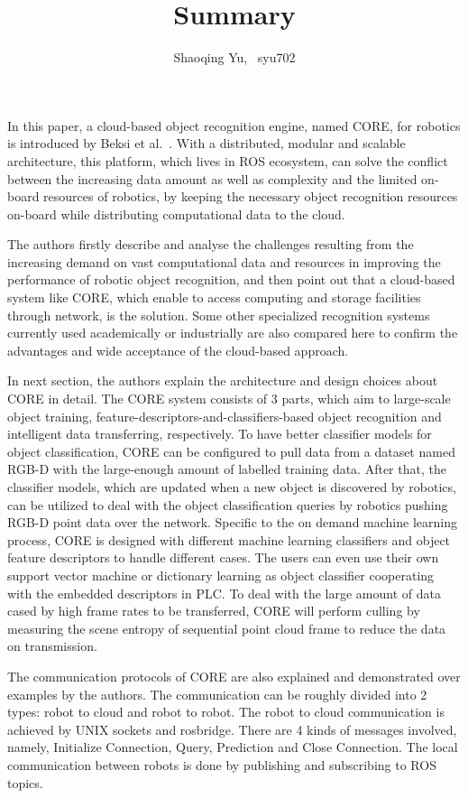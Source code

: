 \documentclass[]{article}
\title{\vspace{-2cm}Summary}
\author{Shaoqing Yu, ~syu702}
\date{}
\begin{document}
\maketitle

In this paper, a cloud-based object recognition engine, named CORE, for robotics is introduced by Beksi et al.~\cite{CORE}. With a distributed, modular and scalable architecture, this platform, which lives in ROS ecosystem, can solve the conflict between the increasing data amount as well as complexity and the limited on-board resources of robotics, by keeping the necessary object recognition resources on-board while distributing computational data to the cloud.

The authors firstly describe and analyse the challenges resulting from the increasing demand on vast computational data and resources in improving the performance of robotic object recognition, and then point out that a cloud-based system like CORE, which enable to access computing and storage facilities through network, is the solution. Some other specialized recognition systems currently used academically or industrially are also compared here to confirm the advantages and wide acceptance of the cloud-based approach.

In next section, the authors explain the architecture and design choices about CORE in detail. The CORE system consists of 3 parts, which aim to large-scale object training, feature-descriptors-and-classifiers-based object recognition and intelligent data transferring, respectively. To have better classifier models for object classification, CORE can be configured to pull data from a dataset named RGB-D with the large-enough amount of labelled training data. After that, the classifier models, which are updated when a new object is discovered by robotics, can be utilized to deal with the object classification queries by robotics pushing RGB-D point data over the network. Specific to the on demand machine learning process, CORE is designed with different machine learning classifiers and object feature descriptors to handle different cases. The users can even use their own support vector machine or dictionary learning as object classifier cooperating with the embedded descriptors in PLC. To deal with the large amount of data cased by high frame rates to be transferred, CORE will perform culling by measuring the scene entropy of sequential point cloud frame to reduce the data on transmission.

The communication protocols of CORE are also explained and demonstrated over examples by the authors. The communication can be roughly divided into 2 types: robot to cloud and robot to robot. The robot to cloud communication is achieved by UNIX sockets and rosbridge. There are 4 kinds of messages involved, namely, Initialize Connection, Query, Prediction and Close Connection. The local communication between robots is done by publishing and subscribing to ROS topics.
\end{document}
